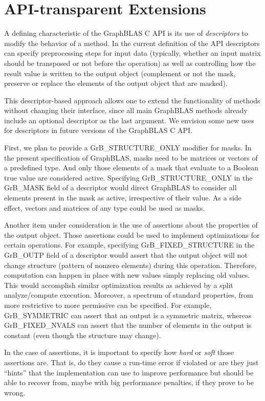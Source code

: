 \section{API-transparent Extensions}
\label{Sec:Extensions}

A defining characteristic of the GraphBLAS C API is its use of
\emph{descriptors} to modify the behavior of a method.  In the current
definition of the API descriptors can specify preprocessing steps for
input data (typically, whether an input matrix should be transposed or
not before the operation) as well as controlling how the result value
is written to the output object (complement or not the mask, preserve
or replace the elements of the output object that are masked).

This descriptor-based approach allows one to extend the functionality of
methods without changing their interface, since all main GraphBLAS methods
already include an optional descriptor as the last argument. We envision
some new uses for descriptors in future versions of the GraphBLAS C API.

First, we plan to provide a {\sf GrB\_STRUCTURE\_ONLY} modifier for masks.
In the present specification of GraphBLAS, masks need to be matrices
or vectors of a predefined type. And only those elements of a mask
that evaluate to a Boolean {\sf true} value are considered active.
Specifying {\sf GrB\_STRUCTURE\_ONLY} in the {\sf GrB\_MASK} field of
a descriptor would direct GraphBLAS to consider all elements present
in the mask as active, irrespective of their value.  As a side effect,
vectors and matrices of any type could be used as masks.

Another item under consideration is the use of assertions about the
properties of the output object. Those assertions could be used to
implement optimizations for certain operations. For example, specifying
{\sf GrB\_FIXED\_STRUCTURE} in the {\sf GrB\_OUTP} field of a descriptor
would assert that the output object will not change structure (pattern
of nonzero elements) during this operation. Therefore, computation
can happen in place with new values simply replacing old values. This
would accomplish similar optimization results as achieved by a split
analyze/compute execution. Moreover, a spectrum of standard properties,
from more restrictive to more permissive can be specified. For example,
{\sf GrB\_SYMMETRIC} can assert that an output is a symmetric matrix,
whereas {\sf GrB\_FIXED\_NVALS} can assert that the number of elements
in the output is constant (even though the structure may change).

In the case of assertions, it is important to specify how \emph{hard}
or \emph{soft} those assertions are. That is, do they cause a run-time
error if violated or are they just ``hints'' that the implementation
can use to improve performance but should be able to recover from,
maybe with big performance penalties, if they prove to be wrong.
